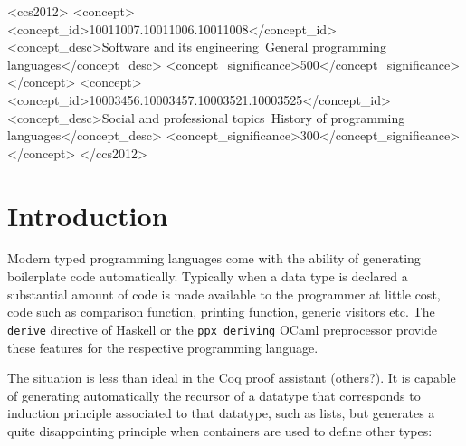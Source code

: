 \documentclass[sigplan,10pt,review]{acmart}\settopmatter{printfolios=true,printccs=false,printacmref=false}
\begin{document}
\begin{CCSXML}
<ccs2012>
<concept>
<concept_id>10011007.10011006.10011008</concept_id>
<concept_desc>Software and its engineering~General programming languages</concept_desc>
<concept_significance>500</concept_significance>
</concept>
<concept>
<concept_id>10003456.10003457.10003521.10003525</concept_id>
<concept_desc>Social and professional topics~History of programming languages</concept_desc>
<concept_significance>300</concept_significance>
</concept>
</ccs2012>
\end{CCSXML}





\maketitle

\section{Introduction}

Modern typed programming languages come with the ability of generating
boilerplate code automatically. Typically when a data type is declared
a substantial amount of code is made available to the programmer
at little cost, code such as comparison function, printing function,
generic visitors etc.  The \verb+derive+ directive of Haskell or the
\verb+ppx_deriving+ OCaml preprocessor provide these features for the
respective programming language.

The situation is less than ideal in the Coq proof assistant (others?).
It is capable of generating automatically the recursor of a datatype that
corresponds to induction principle associated to that datatype, such as
lists, but generates a quite disappointing principle when containers are
used to define other types:
\end{document}

